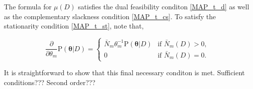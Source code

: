 \documentclass[12pt]{article}
\begin{document}
The formula for $\mu(D)$ satisfies the dual feasibility conditon \eqref{MAP_t_d} as well as the complementary slackness condition \eqref{MAP_t_cs}. To satisfy the stationarity condition \eqref{MAP_t_st}, note that,

\begin{equation}
\frac{\partial}{\partial \theta_m} \text{P}(\bm{\theta} | D) = \begin{cases} \bar{N}_m \theta_m^{-1} \text{P}(\bm{\theta} | D) & \text{if } \bar{N}_m(D) > 0, \\ 0 & \text{if } \bar{N}_m(D) = 0. \end{cases}
\end{equation}

It is straightforward to show that this final necessary conditon is met. Sufficient conditions??? Second order???

\end{document}
